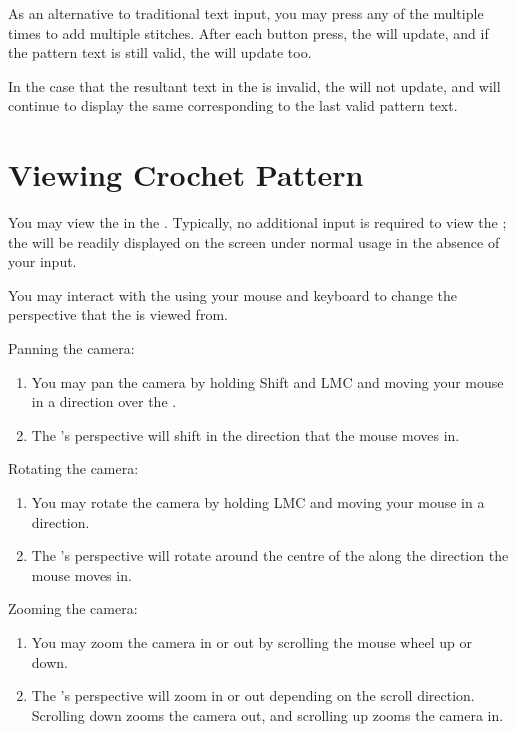 \documentclass[main.tex]{subfiles}
\begin{document}
As an alternative to traditional text input, you may press any of the \ASB{} multiple times to add multiple stitches. After each button press, the \PTI{} will update, and if the pattern text is still valid, the \CRW{} will update too.

In the case that the resultant text in the \PTI{} is invalid, the \CRW{} will not update, and will continue to display the same \RM{} corresponding to the last valid pattern text.

\section{Viewing Crochet Pattern}

You may view the \RM* in the \CRW. Typically, no additional input is required to view the \RM; the \RM{} will be readily displayed on the screen under normal usage in the absence of your input.

You may interact with the \CRW{} using your mouse and keyboard to change the perspective that the \RM{} is viewed from.

Panning the camera:
\begin{enumerate}
\item You may pan the camera by holding Shift and LMC and moving your mouse in a direction over the \CRW.
\item The \CRW's perspective will shift in the direction that the mouse moves in.
\end{enumerate}

Rotating the camera:
\begin{enumerate}
\item You may rotate the camera by holding LMC and moving your mouse in a direction.
\item The \CRW's perspective will rotate around the centre of the \RM{} along the direction the mouse moves in.
\end{enumerate}

Zooming the camera:
\begin{enumerate}
\item You may zoom the camera in or out by scrolling the mouse wheel up or down. 
\item The \CRW's perspective will zoom in or out depending on the scroll direction. Scrolling down zooms the camera out, and scrolling up zooms the camera in.
\end{enumerate}
\end{document}

